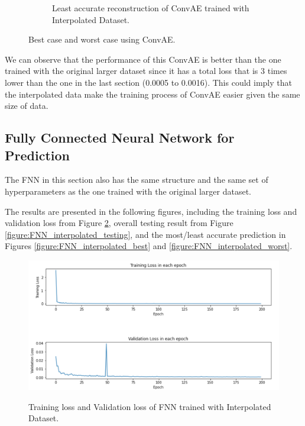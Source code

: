 \begin{figure}[H]
\begin{subfigure}{0.45\textwidth}
    \caption{Least accurate reconstruction of ConvAE trained with Interpolated Dataset.}
\end{subfigure}
\caption{Best case and worst case using ConvAE.}
\label{figure:ConvAE_interpolated_best_worst}
\end{figure}

We can observe that the performance of this ConvAE is better than the one trained with the original larger dataset since it has a total loss that is 3 times lower than the one in the last section (0.0005 to 0.0016). This could imply that the interpolated data make the training process of ConvAE easier given the same size of data. 


\subsection{Fully Connected Neural Network for Prediction}

The FNN in this section also has the same structure and the same set of hyperparameters as the one trained with the original larger dataset.

The results are presented in the following figures, including the training loss and validation loss from Figure \ref{figure:FNN_interpolated_losses}, overall testing result from Figure \ref{figure:FNN_interpolated_testing}, and the most/least accurate prediction in Figures \ref{figure:FNN_interpolated_best} and \ref{figure:FNN_interpolated_worst}.

\begin{figure}[H]
    \caption{Training loss and Validation loss of FNN trained with Interpolated Dataset.}
    \includegraphics[scale=0.6]{figures/mantle_convection_images/larger_dataset_interpolated/FNN_trainingData.png}
    \label{figure:FNN_interpolated_losses}
\end{figure}

